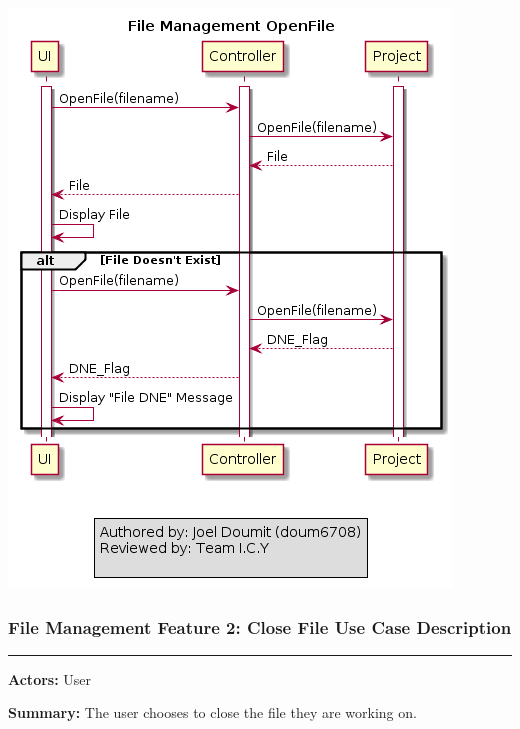 \documentclass[twoside,letterpaper]{article}
\begin{document}
\bigskip

\includegraphics[width=\textwidth]{images/SequenceDiagrams/FM_OpenFile_Image}

\newpage

\subsubsection[File Management Feature 2: Close File Use Case Description]{\rmfamily\bfseries\color{black}
	File Management Feature 2: Close File Use Case Description}
\hypertarget{RefHeading22059017292}{}

\vspace{2pt}
\hrule
\vspace{8pt}
\textbf{Actors:} User \newline

\noindent\textbf{Summary:} The user chooses to close the file they are working on. \newline
\end{document}
